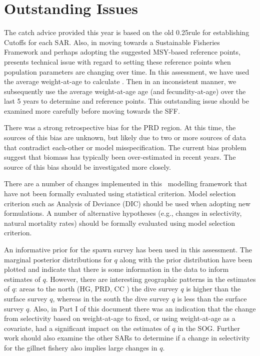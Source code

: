 \section{Outstanding Issues}

The catch advice provided this year is based on the old 0.25\bo rule for establishing Cutoffs for each SAR.  Also, in moving towards a Sustainable Fisheries Framework and perhaps adopting the suggested MSY-based reference points, presents technical issue with regard to setting these reference points when population parameters are changing over time.  In this assessment, we have used the average weight-at-age to calculate \bo.  Then in an inconsistent manner, we subsequently use the average weight-at-age age (and fecundity-at-age) over the last 5 years to determine \bmsy and \fmsy reference points.  This outstanding issue should be examined more carefully before moving towards the SFF.

There was a strong retrospective bias for the PRD region. At this time, the sources of this bias are unknown, but likely due to two or more sources of data that contradict each-other or model misspecification.  The current bias problem suggest that biomass has typically been over-estimated in recent years.  The source of this bias should be investigated more closely.

There are a number of changes implemented in this \iscam\ modelling framework that have not been formally evaluated using statistical criterion. Model selection criterion such as Analysis of Deviance (DIC) should be used when adopting new formulations.  A number of alternative hypotheses (e.g., changes in selectivity, natural mortality rates) should be formally evaluated using model selection criterion.

An informative prior for the spawn survey has been used in this assessment.  The marginal posterior distributions for $q$ along with the prior distribution have been plotted and indicate that there is some information in the data to inform estimates of $q$.  However, there are interesting geographic patterns in the estimates of $q$: areas to the north (HG, PRD, CC ) the dive survey $q$ is higher than the surface survey $q$, whereas in the south the dive survey $q$ is less than the surface survey $q$.  Also, in Part I of this document there was an indication that the change from selectivity based on weight-at-age to fixed, or using weight-at-age as a covariate, had a significant impact on the estimates of $q$ in the SOG.  Further work should also examine the other SARs to determine if a change in selectivity for the gillnet fishery also implies large changes in $q$.

